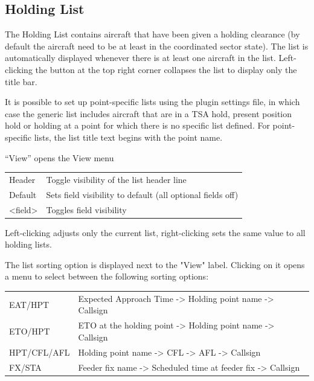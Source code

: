 \documentclass[a4paper,oneside,11pt]{memoir}
\begin{document}
\subsection{Holding List}\label{list:hold}


The Holding List contains aircraft that have been given a holding clearance (by default the aircraft need to be at least in the coordinated sector state). The list is automatically displayed whenever there is at least one aircraft in the list. Left-clicking the button at the top right corner collapses the list to display only the title bar.

\bigskip

It is possible to set up point-specific lists using the plugin settings file, in which case the generic list includes aircraft that are in a TSA hold, present position hold or holding at a point for which there is no specific list defined. For point-specific lists, the list title text begins with the point name.

\bigskip

“View” opens the View menu

\begin{longtable}{p{5cm} p{7.5cm}}
  Header  & Toggle visibility of the list header line\\
  Default & Sets field visibility to default (all optional fields off)\\
  <field> & Toggles field visibility\\
\end{longtable}

Left-clicking adjusts only the current list, right-clicking sets the same value to all holding lists.

\bigskip

The list sorting option is displayed next to the "View" label. Clicking on it opens a menu to select between the following sorting options:

\bigskip

\begin{longtable}{p{5cm} p{7.5cm}}
  EAT/HPT     & Expected Approach Time -> Holding point name -> Callsign\\
  ETO/HPT     & ETO at the holding point -> Holding point name -> Callsign\\
  HPT/CFL/AFL & Holding point name -> CFL -> AFL -> Callsign\\
  FX/STA      & Feeder fix name -> Scheduled time at feeder fix -> Callsign\\
\end{longtable}
\end{document}
